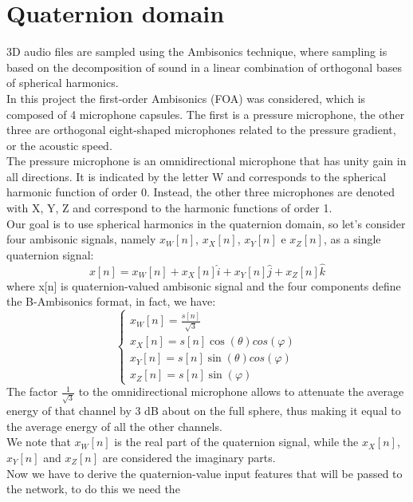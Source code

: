 \documentclass{article}
\begin{document}
    \section{Quaternion domain}
    3D audio files are sampled using the Ambisonics technique, where sampling is based on the decomposition of sound in a linear 
    combination of orthogonal bases of spherical harmonics.
    \\ In this project the first-order Ambisonics (FOA) was considered, which is composed of 4 microphone capsules. The first is
    a pressure microphone, the other three are orthogonal eight-shaped microphones related to the pressure gradient, or the acoustic
    speed.
    \\ The pressure microphone is an omnidirectional microphone that has unity gain in all directions. It is indicated by the letter W 
    and corresponds to the spherical harmonic function of order 0.
    Instead, the other three microphones are denoted with X, Y, Z and correspond to the harmonic functions of order 1.
    \\ Our goal is to use spherical harmonics in the quaternion domain, so let's consider four ambisonic signals, namely $x_W[n]$, 
    $x_X[n]$, $x_Y[n]$ e $x_Z[n]$, as a single quaternion signal:
    \begin{equation*}
        x[n]=x_W[n]+x_X[n]\hat{i}+x_Y[n]\hat{j}+x_Z[n]\hat{k}
    \end{equation*}
    where x[n] is quaternion-valued ambisonic signal and the four components define the B-Ambisonics format, in fact, we have:
    \begin{equation*}
        \begin{cases}
            x_W[n] = \frac{s[n]}{\sqrt{3}} \\
            x_X[n] = s[n] \cos(\theta) cos(\varphi) \\
            x_Y[n] = s[n] \sin(\theta) cos(\varphi) \\
            x_Z[n] = s[n] \sin(\varphi)
        \end{cases}
    \end{equation*}
    The factor $\frac{1}{\sqrt{3}}$ to the omnidirectional microphone allows to attenuate the average energy of that channel by 
    3 dB about on the full sphere, thus making it equal to the average energy of all the other channels.
    \\ We note that $x_W[n]$ is the real part of the quaternion signal, while the $x_X[n]$, $x_Y[n]$ and $x_Z[n]$ are 
    considered the imaginary parts.
    \\ Now we have to derive the quaternion-value input features that will be passed to the network, to do this we need the
\end{document}
